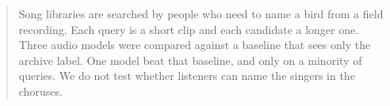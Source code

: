 \begin{abstract}
Song libraries are searched by people who need to name a bird from a field recording. Each query is a short clip and each candidate a longer one. Three audio models were compared against a baseline that sees only the archive label. One model beat that baseline, and only on a minority of queries. We do not test whether listeners can name the singers in the choruses.
\end{abstract}
